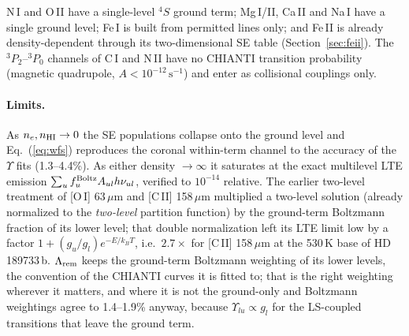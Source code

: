\documentclass[english,a4paper]{my_memo}
\begin{document}
\noindent
N\,I and O\,II have a single-level $^4S$ ground term; Mg\,I/II, Ca\,II
and Na\,I have a single ground level; Fe\,I is built from permitted
lines only; and Fe\,II is already density-dependent through its
two-dimensional SE table (Section~\ref{sec:feii}).  The $^3P_2$--$^3P_0$
channels of C\,I and N\,II have no CHIANTI transition probability
(magnetic quadrupole, $A<10^{-12}\,\mathrm{s^{-1}}$) and enter as
collisional couplings only.

\paragraph{Limits.}  As $n_e,n_{\rm HI}\to0$ the SE populations collapse
onto the ground level and Eq.~(\ref{eq:wfs}) reproduces the coronal
within-term channel to the accuracy of the $\Upsilon$ fits (1.3--4.4\%).
As either density $\to\infty$ it saturates at the exact multilevel LTE
emission $\sum_u f_u^{\rm Boltz} A_{ul} h\nu_{ul}$, verified to
$10^{-14}$ relative.  The earlier two-level treatment of [O\,I]
63\,$\mu$m and [C\,II] 158\,$\mu$m multiplied a two-level solution
(already normalized to the \emph{two-level} partition function) by the
ground-term Boltzmann fraction of its lower level; that double
normalization left its LTE limit low by a factor
$1+(g_u/g_l)e^{-E/k_BT}$, i.e.\ $2.7\times$ for [C\,II] 158\,$\mu$m at
the 530\,K base of HD\,189733\,b.  $\Lambda_{\rm rem}$ keeps the
ground-term Boltzmann weighting of its lower levels, the convention of
the CHIANTI curves it is fitted to; that is the right weighting wherever
it matters, and where it is not the ground-only and Boltzmann weightings
agree to 1.4--1.9\% anyway, because $\Upsilon_{lu}\propto g_l$ for the
LS-coupled transitions that leave the ground term.
\end{document}
